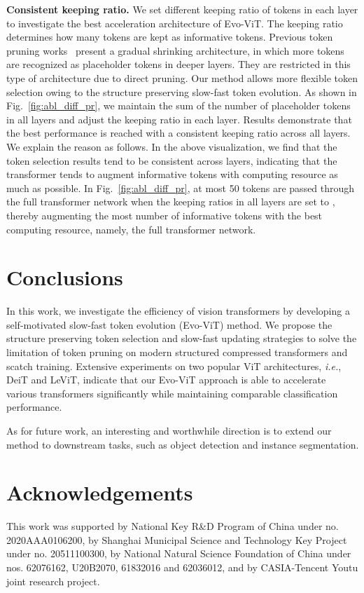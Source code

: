 \documentclass[letterpaper]{article} \usepackage{aaai22}  \usepackage{times}  \usepackage{helvet}  \usepackage{courier}  \usepackage[hyphens]{url}  \usepackage{graphicx} \urlstyle{rm} \def\UrlFont{\rm}  \usepackage{natbib}  \usepackage{caption} \DeclareCaptionStyle{ruled}{labelfont=normalfont,labelsep=colon,strut=off} \frenchspacing  \setlength{\pdfpagewidth}{8.5in}  \setlength{\pdfpageheight}{11in}  \usepackage{algorithm}
\begin{document}
\noindent\textbf{Consistent keeping ratio.} 
We set different keeping ratio of tokens in each layer to investigate the best acceleration architecture of Evo-ViT. The keeping ratio determines how many tokens are kept as informative tokens. Previous token pruning works~\cite{DynamicViT,PatchSlimming} present a gradual shrinking architecture, in which more tokens are recognized as placeholder tokens in deeper layers. They are restricted in this type of architecture due to direct pruning. Our method allows more flexible token selection owing to the structure preserving slow-fast token evolution. As shown in Fig.~\ref{fig:abl_diff_pr}, we maintain the sum of the number of placeholder tokens in all layers and adjust the keeping ratio in each layer. Results demonstrate that the best performance is reached with a consistent keeping ratio across all layers.
We explain the reason as follows. 
In the above visualization, we find that the token selection results tend to be consistent across layers, indicating that the transformer tends to augment informative tokens with computing resource as much as possible. 
In Fig.~\ref{fig:abl_diff_pr}, at most 50 tokens are passed through the full transformer network when the keeping ratios in all layers are set to , thereby augmenting the most number of informative tokens with the best computing resource, namely, the full transformer network. 
\section{Conclusions}
\label{sec:conclusions}
In this work, we investigate the efficiency of vision transformers by developing a self-motivated slow-fast token evolution (Evo-ViT) method. We propose the structure preserving token selection and slow-fast updating strategies to solve the limitation of token pruning on modern structured compressed transformers and scatch training. Extensive experiments on two popular ViT architectures, \emph{i.e.}, DeiT and LeViT, indicate that our Evo-ViT approach is able to accelerate various transformers significantly while maintaining comparable classification performance.

As for future work, an interesting and worthwhile direction is to extend our method to downstream tasks, such as object detection and instance segmentation. 
 
\section{Acknowledgements}
This work was supported by National Key R\&D Program of China under no. 2020AAA0106200, by Shanghai Municipal Science and Technology Key Project under no. 20511100300, by National Natural Science Foundation of China under nos. 62076162, U20B2070, 61832016 and 62036012, and by CASIA-Tencent Youtu joint research project.


\end{document}
